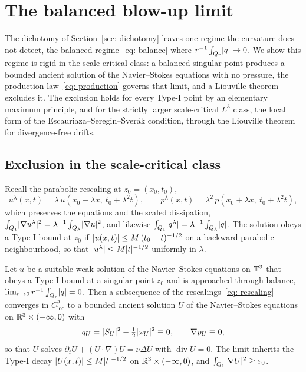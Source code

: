 \section{The balanced blow-up limit}
\label{sec: blowup}

The dichotomy of Section~\ref{sec: dichotomy} leaves one regime the curvature does
not detect, the balanced regime~\eqref{eq: balance} where
$r^{-1}\int_{Q_r}\lvert q \rvert\to 0$. We show this regime is rigid in the scale-critical
class: a balanced singular point produces a bounded ancient solution of the
Navier--Stokes equations with no pressure, the production law~\eqref{eq: production}
governs that limit, and a Liouville theorem excludes it. The exclusion holds for
every Type-I point by an elementary maximum principle, and for the strictly larger
scale-critical $L^3$ class, the local form of the Escauriaza--Seregin--\v{S}ver\'ak
condition, through the Liouville theorem for divergence-free drifts.

\subsection{Exclusion in the scale-critical class}

Recall the parabolic rescaling at $z_0 = (x_0,t_0)$,
\begin{equation}\label{eq: rescaling}
  u^\lambda(x,t) = \lambda\,u(x_0+\lambda x,\ t_0+\lambda^2 t),
  \qquad
  p^\lambda(x,t) = \lambda^2\,p(x_0+\lambda x,\ t_0+\lambda^2 t),
\end{equation}
which preserves the equations and the scaled dissipation,
$\int_{Q_1}\lvert \nabla u^\lambda \rvert^2 = \lambda^{-1}\int_{Q_\lambda}\lvert \nabla u \rvert^2$,
and likewise $\int_{Q_1}\lvert q^\lambda \rvert = \lambda^{-1}\int_{Q_\lambda}\lvert q \rvert$. The
solution obeys a Type-I bound at $z_0$ if $\lvert u(x,t) \rvert \le M\,(t_0-t)^{-1/2}$ on a
backward parabolic neighbourhood, so that $\lvert u^\lambda \rvert\le M\lvert t \rvert^{-1/2}$
uniformly in $\lambda$.

\begin{theorem}\label{thm: blowup}
Let $u$ be a suitable weak solution of
the Navier--Stokes equations on $\mathbb{T}^3$ that obeys a Type-I bound at a singular
point $z_0$ and is approached through balance,
$\lim_{r\to0} r^{-1}\int_{Q_r}\lvert q \rvert = 0$. Then a subsequence of the
rescalings~\eqref{eq: rescaling} converges in $C^2_{\mathrm{loc}}$ to a bounded
ancient solution $U$ of the Navier--Stokes equations on $\mathbb{R}^3\times(-\infty,0)$
with
\begin{equation}\label{eq: limit-pressureless}
  q_U = \lvert S_U \rvert^2 - \tfrac12\lvert \omega_U \rvert^2 \equiv 0,
  \qquad
  \nabla p_U \equiv 0,
\end{equation}
so that $U$ solves $\partial_t U + (U\cdot\nabla)U = \nu\Delta U$ with
$\operatorname{div}U = 0$. The limit inherits the Type-I decay
$\lvert U(x,t) \rvert \le M\lvert t \rvert^{-1/2}$ on $\mathbb{R}^3\times(-\infty,0)$, and
$\int_{Q_1}\lvert \nabla U \rvert^2 \ge \varepsilon_0$.
\end{theorem}

